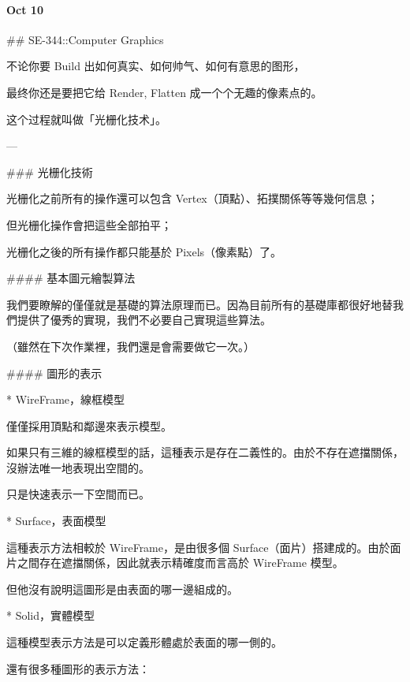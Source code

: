\documentclass[
]{article}
\newenvironment{Shaded}{}{}
\newcommand{\FunctionTok}[1]{\textcolor[rgb]{0.02,0.16,0.49}{#1}}
\newcommand{\NormalTok}[1]{#1}
\newcommand{\StringTok}[1]{\textcolor[rgb]{0.25,0.44,0.63}{#1}}
\begin{document}
\hypertarget{header-n182}{%
\paragraph{Oct 10}\label{header-n182}}

\begin{Shaded}
\begin{Highlighting}[]
\FunctionTok{## SE-344::Computer Graphics}

\NormalTok{不论你要 Build 出如何真实、如何帅气、如何有意思的图形，}

\NormalTok{最终你还是要把它给 Render, Flatten 成一个个无趣的像素点的。}

\NormalTok{这个过程就叫做「光栅化技术」。}

\NormalTok{---}

\FunctionTok{### 光栅化技術}

\NormalTok{光栅化之前所有的操作還可以包含 Vertex（頂點）、拓撲關係等等幾何信息；}

\NormalTok{但光栅化操作會把這些全部拍平；}

\NormalTok{光栅化之後的所有操作都只能基於 Pixels（像素點）了。}

\FunctionTok{#### 基本圖元繪製算法}

\NormalTok{我們要瞭解的僅僅就是基礎的算法原理而已。因為目前所有的基礎庫都很好地替我們提供了優秀的實現，我們不必要自己實現這些算法。}

\NormalTok{（雖然在下次作業裡，我們還是會需要做它一次。）}

\FunctionTok{#### 圖形的表示}

\NormalTok{* }\StringTok{WireFrame，線框模型}

\NormalTok{僅僅採用頂點和鄰邊來表示模型。}

\NormalTok{如果只有三維的線框模型的話，這種表示是存在二義性的。由於不存在遮擋關係，沒辦法唯一地表現出空間的。}

\NormalTok{只是快速表示一下空間而已。}

\NormalTok{* }\StringTok{Surface，表面模型}

\NormalTok{這種表示方法相較於 WireFrame，是由很多個 Surface（面片）搭建成的。由於面片之間存在遮擋關係，因此就表示精確度而言高於 WireFrame 模型。}

\NormalTok{但他沒有說明這圖形是由表面的哪一邊組成的。}

\NormalTok{* }\StringTok{Solid，實體模型}

\NormalTok{這種模型表示方法是可以定義形體處於表面的哪一側的。}

\NormalTok{還有很多種圖形的表示方法：}


\end{Highlighting}
\end{Shaded}
\end{document}
